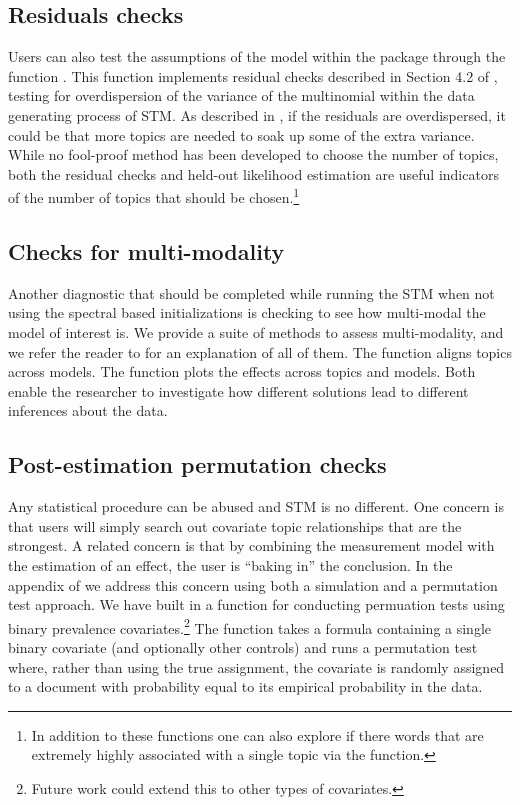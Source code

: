 \documentclass[article,shortnames]{jss}
\begin{document}
\subsection{Residuals checks}
Users can also test the assumptions of the model within the package through the function .  This function implements residual checks described in Section 4.2 of \citet{taddyestimation}, testing for overdispersion of the variance of the multinomial within the data generating process of STM.  As described in \citet{taddyestimation}, if the residuals are overdispersed, it could be that more topics are needed to soak up some of the extra variance.  While no fool-proof method has been developed to choose the number of topics, both the residual checks and held-out likelihood estimation are useful indicators of the number of topics that should be chosen.\footnote{In addition to these functions one can also explore if there words that are extremely highly associated with a single topic via the  function.}

\subsection{Checks for multi-modality}
Another diagnostic that should be completed while running the STM when not using the spectral based initializations is checking to see how multi-modal the model of interest is.  We provide a suite of methods to assess multi-modality, and we refer the reader to \citet{chaptermulti} for an explanation of all of them.  The function  aligns topics across models.  The function  plots the effects across topics and models. Both enable the researcher to investigate how different solutions lead to different inferences about the data.
 

\subsection{Post-estimation permutation checks}
Any statistical procedure can be abused and STM is no different. One concern is that users will simply search out covariate topic relationships that are the strongest. A related concern is that by combining the measurement model with the estimation of an effect, the user is ``baking in'' the conclusion. In the appendix of \cite{ajps} we address this concern using both a simulation and a permutation test approach.  We have built in a function for conducting permuation tests using binary prevalence covariates.\footnote{Future work could extend this to other types of covariates.} The  function takes a formula containing a single binary covariate (and optionally other controls) and runs a permutation test where, rather than using the true assignment, the covariate is randomly assigned to a document with probability equal to its empirical probability in the data.
\end{document}
